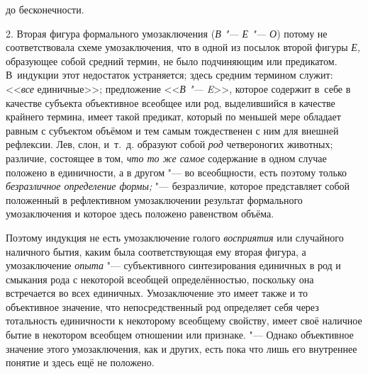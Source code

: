 {\centering
до бесконечности.
\par}

2. Вторая фигура формального умозаключения
({\em В "--- Е "--- О}) потому не соответствовала схеме
умозаключения, что в одной из посылок второй фигуры
{\em Е,} образующее собой
средний термин, не было подчиняющим или предикатом. В~индукции этот
недостаток устраняется; здесь средним термином служит:
<<{\em все} единичные>>;
предложение <<{\em В "--- E}>>,
которое содержит в~себе в качестве субъекта объективное
всеобщее или род, выделившийся в качестве крайнего термина, имеет такой
предикат, который по меньшей мере обладает равным с субъектом объёмом и тем
самым тождественен с ним для внешней рефлексии. Лев, слон, и~т.~д. образуют
собой {\em род} четвероногих животных; различие, состоящее в том,
{\em что то же самое} содержание в одном случае положено в единичности,
а в другом "--- во всеобщности, есть поэтому только
{\em безразличное определение формы;}
"--- безразличие, которое представляет собой положенный в
рефлективном умозаключении результат формального умозаключения и которое
здесь положено равенством объёма.

Поэтому индукция не есть умозаключение голого
{\em восприятия} или
случайного наличного бытия, каким была соответствующая ему вторая фигура, а
умозаключение {\em опыта}
"--- субъективного синтезирования единичных в род и смыкания
рода с некоторой всеобщей определённостью, поскольку она встречается во
всех единичных. Умозаключение это имеет также и то объективное значение,
что непосредственный род определяет себя через тотальность единичности к
некоторому всеобщему свойству, имеет своё наличное бытие в некотором
всеобщем отношении или признаке. "--- Однако объективное
значение этого умозаключения, как и других, есть пока что лишь его
внутреннее понятие и здесь ещё не положено.

